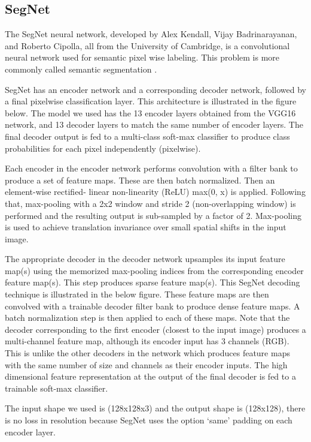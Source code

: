 \documentclass[conference]{IEEEtran}
\begin{document}
\subsection{SegNet}

The SegNet neural network, developed by Alex Kendall, Vijay Badrinarayanan, and Roberto Cipolla, all from the University of Cambridge, is a convolutional neural network used for semantic pixel wise labeling. This problem is more commonly called semantic segmentation \cite{badrinarayanan2017segnet}.

SegNet has an encoder network and a corresponding decoder network, followed by a final pixelwise classification layer. This architecture is illustrated in the figure below.
The model we used has the 13 encoder layers obtained from the VGG16 network, and 13 decoder layers to match the same number of encoder layers. The final decoder output is fed to a multi-class soft-max classifier to produce class probabilities for each pixel independently (pixelwise).

Each encoder in the encoder network performs convolution with a filter bank to produce a set of feature maps. These are then batch normalized. Then an element-wise rectified- linear non-linearity (ReLU) max(0, x) is applied. Following that, max-pooling with a 2x2 window and stride 2 (non-overlapping window) is performed and the resulting output is sub-sampled by a factor of 2. Max-pooling is used to achieve translation invariance over small spatial shifts in the input image.

The appropriate decoder in the decoder network upsamples its input feature map(s) using the memorized max-pooling indices from the corresponding encoder feature map(s). This step produces sparse feature map(s). This SegNet decoding technique is illustrated in the below figure.
These feature maps are then convolved with a trainable decoder filter bank to produce dense feature maps. A batch normalization step is then applied to each of these maps. Note that the decoder corresponding to the first encoder (closest to the input image) produces a multi-channel feature map, although its encoder input has 3 channels (RGB).
This is unlike the other decoders in the network which produces feature maps with the same number of size and channels as their encoder inputs. The high dimensional feature representation at the output of the final decoder is fed to a trainable soft-max classifier. \cite{badrinarayanan2017segnet}

The input shape we used is (128x128x3) and the output shape is (128x128), there is no loss in resolution because SegNet uses the option `same' padding on each encoder layer.
\end{document}
